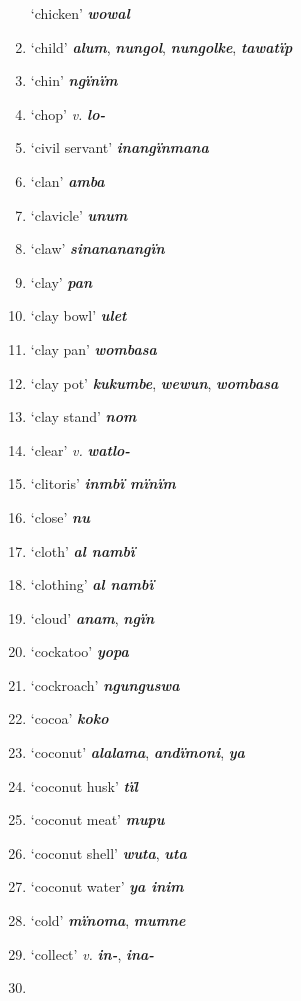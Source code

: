\begin{enumerate}[noitemsep, label={}, align=left, widest=190, labelsep=1ex,leftmargin=*,itemindent=-10pt]
‘chicken’ \textbf{\textit{wowal}} \item
‘child’ \textbf{\textit{alum}}, \textbf{\textit{nungol}}, \textbf{\textit{nungolke}}, \textbf{\textit{tawatïp}} \item
‘chin’ \textbf{\textit{ngïnïm}} \item
‘chop’ \textit{v.} \textbf{\textit{lo-}} \item
‘civil servant’ \textbf{\textit{inangïnmana}} \item
‘clan’ \textbf{\textit{amba}} \item
‘clavicle’ \textbf{\textit{unum}} \item
‘claw’ \textbf{\textit{sinananangïn}} \item
‘clay’ \textbf{\textit{pan}} \item
‘clay bowl’ \textbf{\textit{ulet}} \item
‘clay pan’ \textbf{\textit{wombasa}} \item
‘clay pot’ \textbf{\textit{kukumbe}}, \textbf{\textit{wewun}}, \textbf{\textit{wombasa}} \item
‘clay stand’ \textbf{\textit{nom}} \item
‘clear’ \textit{v.} \textbf{\textit{watlo-}} \item
‘clitoris’ \textbf{\textit{inmbï mïnïm}} \item
‘close’ \textbf{\textit{nu}} \item
‘cloth’ \textbf{\textit{al nambï}} \item
‘clothing’ \textbf{\textit{al nambï}} \item
‘cloud’ \textbf{\textit{anam}}, \textbf{\textit{ngïn}} \item
‘cockatoo’ \textbf{\textit{yopa}} \item
‘cockroach’ \textbf{\textit{ngunguswa}} \item
‘cocoa’ \textbf{\textit{koko}} \item
‘coconut’ \textbf{\textit{alalama}}, \textbf{\textit{andïmoni}}, \textbf{\textit{ya}} \item
‘coconut husk’ \textbf{\textit{tïl}} \item
‘coconut meat’ \textbf{\textit{mupu}} \item
‘coconut shell’ \textbf{\textit{wuta}}, \textbf{\textit{uta}} \item
‘coconut water’ \textbf{\textit{ya inim}} \item
‘cold’ \textbf{\textit{mïnoma}}, \textbf{\textit{mumne}} \item
‘collect’ \textit{v.} \textbf{\textit{in-}}, \textbf{\textit{ina-}} \item

\end{enumerate}
